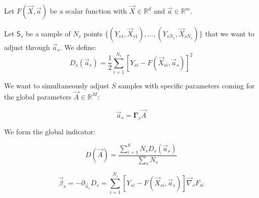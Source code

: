 \documentclass[aps,12pt]{revtex4}
\begin{document}
Let $F(\vec{X},\vec{a})$ be a scalar function with $\vec{X} \in \mathbb{R}^d$ and $\vec{a}\in\mathbb{R}^m$.

Let $\mathsf{S}_s$ be a sample of $N_s$ points $\lbrace(Y_{s1},\vec{X}_{s1}),\ldots,(Y_{sN_s},\vec{X}_{sN_s})\rbrace$
that we want to adjust through $\vec{a}_s$.
We define:
\begin{equation}
	D_s(\vec{a}_s) = \dfrac{1}{2}\sum_{i=1}^{N_s} \left[ Y_{si} - F(\vec{X}_{si},\vec{a}_s)\right] ^2
\end{equation}

We want to simultaneously adjust $S$ samples with specific parameters coming for the global parameters $\vec{A}\in\mathbb{R}^M$:
	
\begin{equation}
	\vec{a}_s = \bm{\Gamma}_s \vec{A}
\end{equation}

We form the global indicator:

\begin{equation}
	D(\vec{A}) = \dfrac{\sum_{i=1}^{S} N_s D_s(\vec{a}_s)}{\sum_s N_s }
\end{equation}

\begin{equation}
	\vec{\beta}_s = -\partial_{\vec{a}_s} D_s 
	= \sum_{i=1}^{N_s} \left[Y_{si} - F(\vec{X}_{si},\vec{a}_s)\right] \vec{\nabla}_s F_{si} 
\end{equation}
\end{document}
